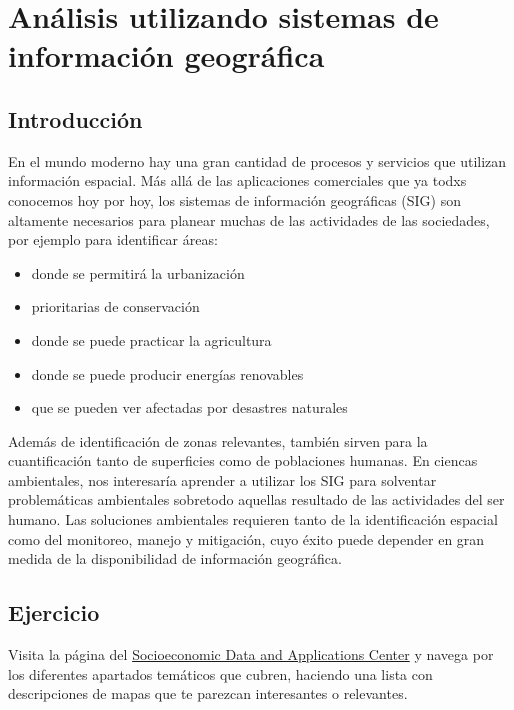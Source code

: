 \documentclass[
]{book}
\providecommand{\tightlist}{%
  \setlength{\itemsep}{0pt}\setlength{\parskip}{0pt}}
\begin{document}
\hypertarget{anuxe1lisis-utilizando-sistemas-de-informaciuxf3n-geogruxe1fica}{%
\section{Análisis utilizando sistemas de información geográfica}\label{anuxe1lisis-utilizando-sistemas-de-informaciuxf3n-geogruxe1fica}}

\hypertarget{introducciuxf3n}{%
\subsection{Introducción}\label{introducciuxf3n}}

En el mundo moderno hay una gran cantidad de procesos y servicios que utilizan información espacial. Más allá de las aplicaciones comerciales que ya todxs conocemos hoy por hoy, los sistemas de información geográficas (SIG) son altamente necesarios para planear muchas de las actividades de las sociedades, por ejemplo para identificar áreas:

\begin{itemize}
\tightlist
\item
  donde se permitirá la urbanización
\item
  prioritarias de conservación
\item
  donde se puede practicar la agricultura
\item
  donde se puede producir energías renovables
\item
  que se pueden ver afectadas por desastres naturales
\end{itemize}

Además de identificación de zonas relevantes, también sirven para la cuantificación tanto de superficies como de poblaciones humanas. En ciencas ambientales, nos interesaría aprender a utilizar los SIG para solventar problemáticas ambientales sobretodo aquellas resultado de las actividades del ser humano. Las soluciones ambientales requieren tanto de la identificación espacial como del monitoreo, manejo y mitigación, cuyo éxito puede depender en gran medida de la disponibilidad de información geográfica.

\hypertarget{ejercicio}{%
\subsection{Ejercicio}\label{ejercicio}}

Visita la página del \href{https://sedac.ciesin.columbia.edu/}{Socioeconomic Data and Applications Center} y navega por los diferentes apartados temáticos que cubren, haciendo una lista con descripciones de mapas que te parezcan interesantes o relevantes.
\end{document}
